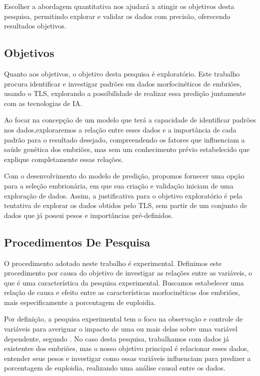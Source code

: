 Escolher a abordagem quantitativa nos ajudará a atingir os objetivos desta pesquisa, permitindo explorar e validar os dados com precisão, oferecendo resultados objetivos. 

\subsection{Objetivos}

Quanto aos objetivos, o objetivo desta pesquisa é exploratório. Este trabalho procura identificar e investigar padrões em dados morfocinéticos de embriões, usando o TLS, explorando a possibilidade de realizar essa predição juntamente com as tecnologias de IA.

Ao focar na concepção de um modelo que terá a capacidade de identificar padrões nos dados,exploraremos a relação entre esses dados e a importância de cada padrão para o resultado desejado, compreendendo os fatores que influenciam a saúde genética dos embriões, mas sem um conhecimento prévio estabelecido que explique completamente essas relações.

Com o desenvolvimento do modelo de predição, propomos fornecer uma opção para a seleção embrionária, em que sua criação e validação iniciam de uma exploração de dados. Assim, a justificativa para o objetivo exploratório é pela tentativa de explorar os dados obtidos pelo TLS, sem partir de um conjunto de dados que já possui pesos e importâncias pré-definidos. 

\subsection{Procedimentos De Pesquisa}

O procedimento adotado neste trabalho é experimental. Definimos este procedimento por causa do objetivo de investigar as relações entre as variáveis, o que é uma característica da pesquisa experimental. Buscamos estabelecer uma relação de causa e efeito entre as características morfocinéticas dos embriões, mais especificamente a porcentagem de euploidia.

Por definição, a pesquisa experimental tem o foco na observação e controle de variáveis para averiguar o impacto de uma ou mais delas sobre uma variável dependente, segundo . No caso desta pesquisa, trabalhamos com dados já existentes dos embriões, mas o nosso objetivo principal é relacionar esses dados, entender seus pesos e investigar como essas variáveis influenciam para predizer a porcentagem de euploidia, realizando uma análise causal entre os dados. 

